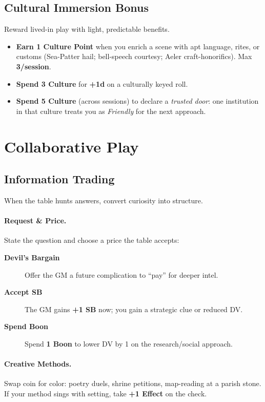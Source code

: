 \subsection{Cultural Immersion Bonus}
Reward lived-in play with light, predictable benefits.
\begin{itemize}
  \item \textbf{Earn 1 Culture Point} when you enrich a scene with apt language, rites, or customs (Sea-Patter hail; bell-speech courtesy; Aeler craft-honorifics). Max \textbf{3/session}.
  \item \textbf{Spend 3 Culture} for \textbf{+1d} on a culturally keyed roll.
  \item \textbf{Spend 5 Culture} (across sessions) to declare a \emph{trusted door}: one institution in that culture treats you as \textit{Friendly} for the next approach.
\end{itemize}

\section{Collaborative Play}

\subsection{Information Trading}
When the table hunts answers, convert curiosity into structure.

\paragraph{Request \& Price.}
State the question and choose a price the table accepts:
\begin{description}
  \item[\textbf{Devil's Bargain}] Offer the GM a future complication to ``pay'' for deeper intel.
  \item[\textbf{Accept SB}] The GM gains \textbf{+1 SB} now; you gain a strategic clue or reduced DV.
  \item[\textbf{Spend Boon}] Spend \textbf{1 Boon} to lower DV by 1 on the research/social approach.
\end{description}

\paragraph{Creative Methods.}
Swap coin for color: poetry duels, shrine petitions, map-reading at a parish stone. If your method sings with setting, take \textbf{+1 Effect} on the check.

